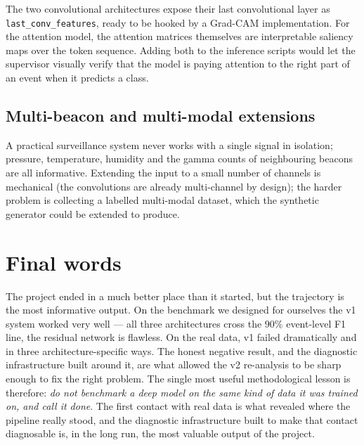 The two convolutional architectures expose their last convolutional
layer as \texttt{last\_conv\_features}, ready to be hooked by a
Grad-CAM implementation. For the attention model, the attention
matrices themselves are interpretable saliency maps over the token
sequence. Adding both to the inference scripts would let the
supervisor visually verify that the model is paying attention to the
right part of an event when it predicts a class.

\subsection{Multi-beacon and multi-modal extensions}

A practical surveillance system never works with a single signal in
isolation; pressure, temperature, humidity and the gamma counts of
neighbouring beacons are all informative. Extending the input to a
small number of channels is mechanical (the convolutions are already
multi-channel by design); the harder problem is collecting a labelled
multi-modal dataset, which the synthetic generator could be extended
to produce.

\section{Final words}
\label{sec:conc-final}

The project ended in a much better place than it started, but the
trajectory is the most informative output. On the benchmark we
designed for ourselves the v1 system worked very well --- all three
architectures cross the $90\%$ event-level F1 line, the residual
network is flawless. On the real data, v1 failed dramatically and in
three architecture-specific ways. The honest negative result, and the
diagnostic infrastructure built around it, are what allowed the v2
re-analysis to be sharp enough to fix the right problem. The single
most useful methodological lesson is therefore: \emph{do not benchmark
a deep model on the same kind of data it was trained on, and call it
done}. The first contact with real data is what revealed where the
pipeline really stood, and the diagnostic infrastructure built to make
that contact diagnosable is, in the long run, the most valuable output
of the project.
